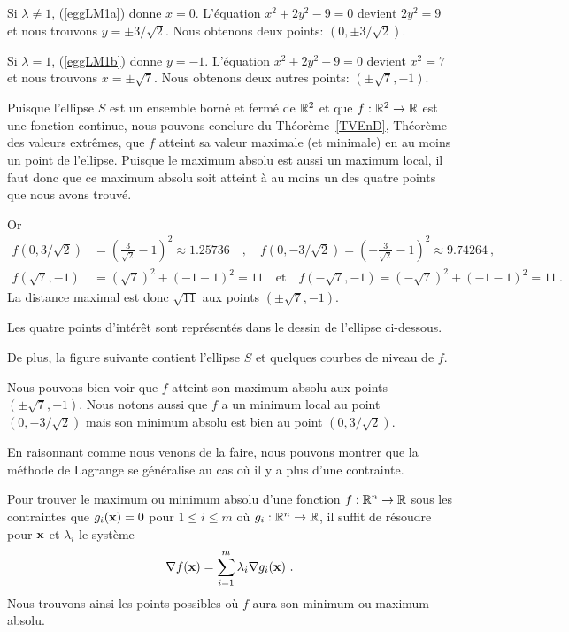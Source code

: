 {\begin{egg}
Si $\lambda \neq 1$, (\ref{eggLM1a}) donne $x = 0$.   L'équation
$x^2 + 2 y^2 - 9 = 0$ devient $2 y^2 = 9$ et nous trouvons
$y = \pm 3/\sqrt{2}$.   Nous obtenons deux points: $(0, \pm 3/\sqrt{2})$.

Si $\lambda = 1$, (\ref{eggLM1b}) donne $y = -1$.   L'équation
$x^2 + 2 y^2 - 9 = 0$ devient $x^2 = 7$ et nous trouvons
$x = \pm \sqrt{7}$.   Nous obtenons deux autres points: $(\pm \sqrt{7}, -1)$.

Puisque l'ellipse $S$ est un ensemble borné et fermé de $\mathbb{R}^2$ et que
$f:\mathbb{R}^2 \to \mathbb{R}$ est une fonction continue, nous pouvons conclure du
Théorème~\ref{TVEnD}, Théorème des valeurs extrêmes, que $f$ atteint
sa valeur maximale (et minimale) en au moins un point de l'ellipse.
Puisque le maximum absolu est aussi un maximum local, il faut donc que
ce maximum absolu soit atteint à au moins un des quatre points que
nous avons trouvé.

Or
\begin{align*}
f(0,3/\sqrt{2}) &= \left(\frac{3}{\sqrt{2}} - 1\right)^2 \approx 1.25736
\quad , \quad
f(0,-3/\sqrt{2}) = \left(-\frac{3}{\sqrt{2}} - 1\right)^2 \approx 9.74264
\ , \\
f(\sqrt{7},-1) &= (\sqrt{7})^2 + (-1-1)^2 = 11
\quad \text{et} \quad
f(-\sqrt{7},-1) = (-\sqrt{7})^2 + (-1-1)^2 = 11 \ .
\end{align*}
La distance maximal est donc $\sqrt{11}$ aux points $(\pm\sqrt{7}, -1)$.

Les quatre points d'intérêt sont représentés dans le dessin de
l'ellipse ci-dessous.

De plus, la figure suivante contient l'ellipse $S$ et quelques courbes
de niveau de $f$.

Nous pouvons bien voir que $f$ atteint son maximum absolu aux points
$(\pm\sqrt{7}, -1)$.  Nous notons aussi que $f$ a un minimum local au
point $(0,-3/\sqrt{2})$ mais son minimum absolu est bien au point
$(0,3/\sqrt{2})$.
\label{eggLM1}
\end{egg}

En raisonnant comme nous venons de la faire, nous pouvons montrer que la méthode
de Lagrange se généralise au cas où il y a plus d'une contrainte.

\begin{focus}{\mth} 
Pour trouver le maximum ou minimum absolu d'une fonction
$f:\mathbb{R}^n \to \mathbb{R}$ sous les contraintes que $g_i(\mathbf{x}) = 0$ pour
$1\leq i \leq m$ où $g_i:\mathbb{R}^n \to \mathbb{R}$, il suffit de résoudre pour
$\mathbf{x}$ et $\lambda_i$ le système
\[
 \nabla f(\mathbf{x}) = \sum_{i=1}^m \lambda_i \nabla g_i(\mathbf{x}) \ .
\]
Nous trouvons ainsi les points possibles où $f$ aura son minimum ou
maximum absolu.
\end{focus}

}
